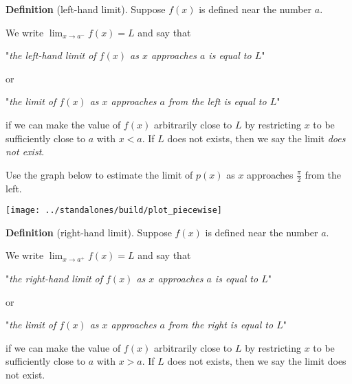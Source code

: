 \documentclass[../main.tex]{subfiles}
\begin{document}
\begin{mdframed}[style=withref]
  \textbf{Definition} (left-hand limit). Suppose \(f(x)\) is defined near the number \(a\).

  We write {\(\lim_{x \to a^{-}} f(x) = L\)} and say that
  \begin{center}
    "\emph{the {left-hand limit} of \(f(x)\) as \(x\) approaches \(a\) is equal to \(L\)}"
  \end{center}
  or
  \begin{center}
    "\emph{the {limit} of \(f(x)\) as \(x\) approaches \(a\) {from the left} is equal to \(L\)}"
  \end{center}
  if we can make the value of \(f(x)\) arbitrarily close to \(L\) by restricting \(x\) to be sufficiently close to \(a\) with \(x < a\). If \(L\) does not exists, then we say the limit \emph{does not exist}.

\end{mdframed}
\vfill

\begin{example}
  Use the graph below to estimate the limit of \(p(x)\) as \(x\) approaches \(\frac{\pi}{2}\) from the left.

  \texttt{[image: ../standalones/build/plot\_piecewise]}
\end{example}


\begin{mdframed}[style=withref]
  \textbf{Definition} (right-hand limit). Suppose \(f(x)\) is defined {near} the number \(a\).

  We write \({\lim_{x \to a^{+}} f(x)} = L\) and say that
  \begin{center}
    "\emph{the {right-hand limit} of \(f(x)\) as \(x\) {approaches} \(a\) is equal to \(L\)}"
  \end{center}
  or
  \begin{center}
    "\emph{the {limit} of \(f(x)\) as \(x\) {approaches} \(a\) {from the right} is equal to \(L\)}"
  \end{center}
  if we can make the value of \(f(x)\) {arbitrarily} close to \(L\) by {restricting} \(x\) to be {sufficiently close} to \(a\) with {\(x > a\)}. If \(L\) does not exists, then we say the limit does not exist.

\end{mdframed}
\end{document}
